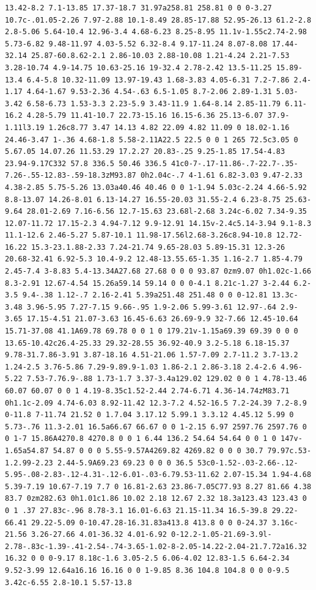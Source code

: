 \documentclass[11pt]{article}
\begin{document}
\begin{enumerate}
\begin{verbatim}
13.42-8.2 7.1-13.85 17.37-18.7 31.97a258.81 258.81 0 0 0-3.27 10.7c-.01.05-2.26 7.97-2.88 10.1-8.49 28.85-17.88 52.95-26.13 61.2-2.8 2.8-5.06 5.64-10.4 12.96-3.4 4.68-6.23 8.25-8.95 11.1v-1.55c2.74-2.98 5.73-6.82 9.48-11.97 4.03-5.52 6.32-8.4 9.17-11.24 8.07-8.08 17.44-32.14 25.87-60.8.62-2.1 2.86-10.03 2.88-10.08 1.21-4.24 2.21-7.53 3.28-10.74 4.9-14.75 10.63-25.16 19-32.4 2.78-2.42 13.5-11.25 15.89-13.4 6.4-5.8 10.32-11.09 13.97-19.43 1.68-3.83 4.05-6.31 7.2-7.86 2.4-1.17 4.64-1.67 9.53-2.36 4.54-.63 6.5-1.05 8.7-2.06 2.89-1.31 5.03-3.42 6.58-6.73 1.53-3.3 2.23-5.9 3.43-11.9 1.64-8.14 2.85-11.79 6.11-16.2 4.28-5.79 11.41-10.7 22.73-15.16 16.15-6.36 25.13-6.07 37.9-1.11l3.19 1.26c8.77 3.47 14.13 4.82 22.09 4.82 11.09 0 18.02-1.16 24.46-3.47 1-.36 4.68-1.8 5.58-2.11A22.5 22.5 0 0 1 265 72.5c3.05 0 5.67.05 14.07.26 11.53.29 17.2.27 20.83-.25 9.25-1.85 17.54-4.83 23.94-9.17C332 57.8 336.5 50.46 336.5 41c0-7-.17-11.86-.7-22.7-.35-7.26-.55-12.83-.59-18.3zM93.87 0h2.04c-.7 4-1.61 6.82-3.03 9.47-2.33 4.38-2.85 5.75-5.26 13.03a40.46 40.46 0 0 1-1.94 5.03c-2.24 4.66-5.92 8.8-13.07 14.26-8.01 6.13-14.27 16.55-20.03 31.55-2.4 6.23-8.75 25.63-9.64 28.01-2.69 7.16-6.56 12.7-15.63 23.68l-2.68 3.24c-6.02 7.34-9.35 12.07-11.72 17.15-2.3 4.94-7.12 9.9-12.91 14.15v-2.4c5.14-3.94 9.1-8.3 11.1-12.6 2.46-5.27 5.87-10.1 11.98-17.56l2.68-3.26c8.94-10.8 12.72-16.22 15.3-23.1.88-2.33 7.24-21.74 9.65-28.03 5.89-15.31 12.3-26 20.68-32.41 6.92-5.3 10.4-9.2 12.48-13.55.65-1.35 1.16-2.7 1.85-4.79 2.45-7.4 3-8.83 5.4-13.34A27.68 27.68 0 0 0 93.87 0zm9.07 0h1.02c-1.66 8.3-2.91 12.67-4.54 15.26a59.14 59.14 0 0 0-4.1 8.21c-1.27 3-2.44 6.2-3.5 9.4-.38 1.12-.7 2.16-2.41 5.39a251.48 251.48 0 0 0-12.81 13.3c-3.48 3.96-5.95 7.27-7.15 9.66-.95 1.9-2.06 5.99-3.61 12.97-.64 2.9-3.65 17.15-4.51 21.07-3.63 16.45-6.63 26.69-9.9 32-7.66 12.45-10.64 15.71-37.08 41.1A69.78 69.78 0 0 1 0 179.21v-1.15a69.39 69.39 0 0 0 13.65-10.42c26.4-25.33 29.32-28.55 36.92-40.9 3.2-5.18 6.18-15.37 9.78-31.7.86-3.91 3.87-18.16 4.51-21.06 1.57-7.09 2.7-11.2 3.7-13.2 1.24-2.5 3.76-5.86 7.29-9.89.9-1.03 1.86-2.1 2.86-3.18 2.4-2.6 4.96-5.22 7.53-7.76.9-.88 1.73-1.7 3.37-3.4a129.02 129.02 0 0 1 4.78-13.46 60.07 60.07 0 0 1 4.19-8.35c1.52-2.44 2.74-6.71 4.36-14.74zM83.71 0h1.1c-2.09 4.74-6.03 8.92-11.42 12.3-7.2 4.52-16.5 7.2-24.39 7.2-8.9 0-11.8 7-11.74 21.52 0 1.7.04 3.17.12 5.99.1 3.3.12 4.45.12 5.99 0 5.73-.76 11.3-2.01 16.5a66.67 66.67 0 0 1-2.15 6.97 2597.76 2597.76 0 0 1-7 15.86A4270.8 4270.8 0 0 1 6.44 136.2 54.64 54.64 0 0 1 0 147v-1.65a54.87 54.87 0 0 0 5.55-9.57A4269.82 4269.82 0 0 0 30.7 79.97c.53-1.2.99-2.23 2.44-5.9A69.23 69.23 0 0 0 36.5 53c0-1.52-.03-2.66-.12-5.95-.08-2.83-.12-4.31-.12-6.01-.03-6.79.53-11.62 2.07-15.34 1.94-4.68 5.39-7.19 10.67-7.19 7.7 0 16.81-2.63 23.86-7.05C77.93 8.27 81.66 4.38 83.7 0zm282.63 0h1.01c1.86 10.02 2.18 12.67 2.32 18.3a123.43 123.43 0 0 1 .37 27.83c-.96 8.78-3.1 16.01-6.63 21.15-11.34 16.5-39.8 29.22-66.41 29.22-5.09 0-10.47.28-16.31.83a413.8 413.8 0 0 0-24.37 3.16c-21.56 3.26-27.66 4.01-36.32 4.01-6.92 0-12.2-1.05-21.69-3.9l-2.78-.83c-1.39-.41-2.54-.74-3.65-1.02-8-2.05-14.22-2.04-21.7.72a16.32 16.32 0 0 0-9.17 8.18c-1.6 3.05-2.5 6.06-4.02 12.83-1.5 6.64-2.34 9.52-3.99 12.64a16.16 16.16 0 0 1-9.85 8.36 104.8 104.8 0 0 0-9.5 3.42c-6.55 2.8-10.1 5.57-13.8 
\end{verbatim}
\end{enumerate}
\end{document}
